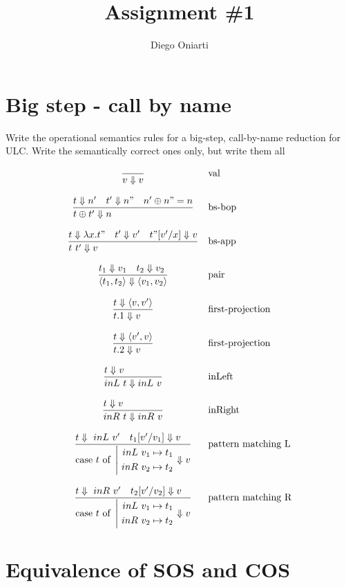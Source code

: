 \documentclass{article}
\title{Assignment \#1}
\author{Diego Oniarti}
\newcommand{\bop}[0]{\ensuremath\oplus}
\newcommand{\st}[3][]{\ensuremath{\displaystyle\frac{#3\hfill}{#2\hfill} \text{#1}}}
\newcommand{\lam}[2]{\ensuremath{\lambda#1.#2}}
\newcommand{\inl}[0]{\ensuremath{\ inL\ }}
\newcommand{\inr}[0]{\ensuremath{\ inR\ }}
\newcommand{\case}[3]{\ensuremath{\text{case}\ #1\ \text{of}\ \left|\begin{aligned}#2\\#3\end{aligned}\right.}}
\newcommand{\Da}[0]{\ensuremath{\Downarrow}}
\begin{document}
\maketitle

\section{Big step - call by name}
Write the operational semantics rules for a big-step, call-by-name reduction for ULC. Write the semantically correct ones only, but write them all

\[\begin{array}{cl}
    \st{v\Downarrow v}{} & \text{val}\\
    \\
    \st{t \bop t' \Downarrow n}{t\Downarrow n' \quad t'\Downarrow n" \quad n'\bop n" = n} & \text{bs-bop} \\
    \\
    \st{t\ t'\Downarrow v}{t\Downarrow \lam{x}{t"} \quad t'\Downarrow v' \quad t"[v'/x]\Downarrow v}  & \text{bs-app} \\
    \\
    \st{\langle t_1, t_2 \rangle \Downarrow \langle v_1,v_2 \rangle}{t_1\Downarrow v_1\quad t_2\Downarrow v_2} & \text{pair} \\
    \\
    \st{t.1\Downarrow v}{t\Downarrow \langle v,v' \rangle} & \text{first-projection} \\
    \\
    \st{t.2\Downarrow v}{t\Downarrow \langle v',v \rangle} & \text{first-projection} \\
    \\
    \st{inL\ t\Downarrow inL\ v}{t\Downarrow v} & \text{inLeft} \\
    \\
    \st{inR\ t\Downarrow inR\ v}{t\Downarrow v} & \text{inRight} \\
    \\
    \st{\case{t}{\inl v_1\mapsto t_1}{\inr v_2\mapsto t_2}\Downarrow v}{t\Da \inl v' \quad t_1[v'/v_1]\Da v} & \text{pattern matching L}
    \\ \\
    \st{\case{t}{\inl v_1\mapsto t_1}{\inr v_2\mapsto t_2}\Downarrow v}{t\Da \inr v' \quad t_2[v'/v_2]\Da v} & \text{pattern matching R}
\end{array}\] 

\section{Equivalence of SOS and COS}
\end{document}
